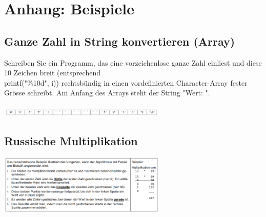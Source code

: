 \newpage
\section{Anhang: Beispiele}
	\subsection{Ganze Zahl in String konvertieren (Array)} 
		Schreiben Sie ein Programm, das eine vorzeichenlose ganze Zahl einliest und diese 10 Zeichen breit (entsprechend\\ printf("\%10d", i)) rechtsbündig in einen vordefinierten Character-Array fester Grösse schreibt. Am Anfang des Arrays steht der String "Wert: ".\\\\ 
		\includegraphics[width=0.6\textwidth]{pics/bsp1.png}
		
	\subsection	{Russische Multiplikation}
		\includegraphics[width=0.6\textwidth]{pics/bsp2.png}
		
		
		